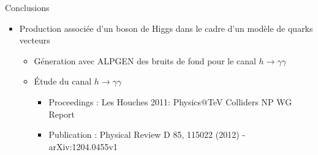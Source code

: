 \documentclass[usenames,dvipsnames]{beamer}
\begin{document}
\begin{frame}{Conclusions}
\begin{block}{}
\begin{itemize}
\begin{itemize}
\begin{itemize}
    \end{itemize}
  \end{itemize}
  \item Production associée d'un boson de Higgs dans le cadre d'un modèle de quarks vecteurs
  \begin{itemize}\scriptsize
    \item Géneration avec ALPGEN des bruits de fond pour le canal $h\to\gamma\gamma$
    \item Étude du canal $h\to\gamma\gamma$
    \begin{itemize}\tiny
      \item Proceedings : Les Houches 2011: Physics@TeV Colliders NP WG Report%
      \item Publication : Physical Review D 85, 115022 (2012) - arXiv:1204.0455v1
    \end{itemize}
  \end{itemize}
\end{itemize}
\end{block}
\end{frame}
\end{document}
